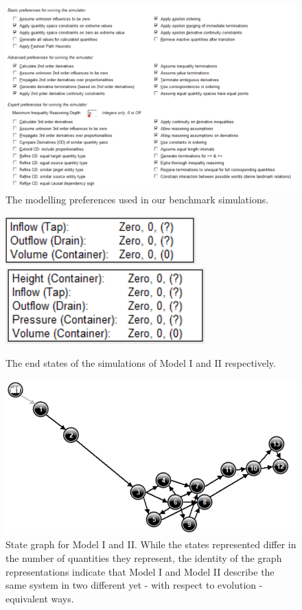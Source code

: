 \documentclass{article}
\begin{document}
\begin{figure}
	\includegraphics{Modelling_Settings}
	\caption{The modelling preferences used in our benchmark simulations.}
	\label{figure5}
\end{figure}

\begin{figure}
	\includegraphics{End_State}
	\includegraphics{End_State_Extra}
	\caption{The end states of the simulations of Model I and II respectively.}
	\label{figure6}
\end{figure}

\begin{figure}
	\includegraphics{Simple_State_Graph.png}
	\caption{State graph for Model I and II. While the states represented differ in the number of quantities they represent, the identity of the graph representations indicate that Model I and Model II describe the same system in two different yet - with respect to evolution - equivalent ways.}
	\label{figure7}
\end{figure}
\end{document}
